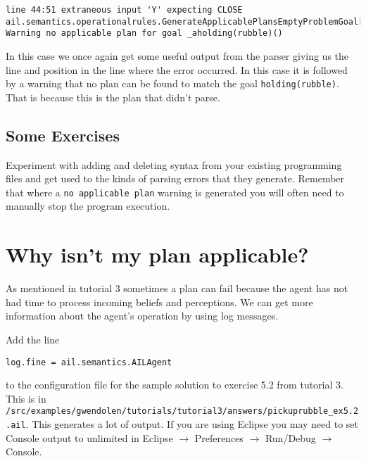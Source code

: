 \begin{verbatim}
line 44:51 extraneous input 'Y' expecting CLOSE
ail.semantics.operationalrules.GenerateApplicablePlansEmptyProblemGoal[WARNING|main|3:19:44]: 
Warning no applicable plan for goal _aholding(rubble)() 
\end{verbatim}

In this case we once again get some useful output from the parser giving us the line and position in the line where the error occurred.  In this case it is followed by a warning that no plan can be found to match the goal \texttt{holding(rubble)}.  That is because this is the plan that didn't parse.

\subsection{Some Exercises}
Experiment with adding and deleting syntax from your existing programming files and get used to the kinds of parsing errors that they generate.  Remember that where a \texttt{no applicable plan} warning is generated you will often need to manually stop the program execution.

\section{Why isn't my plan applicable?}

As mentioned in tutorial 3 sometimes a plan can fail because the agent has not had time to process incoming beliefs and perceptions.  We can get more information about the agent's operation by using log messages.

Add the line
\begin{verbatim}
log.fine = ail.semantics.AILAgent
\end{verbatim}
to the configuration file for the sample solution to exercise 5.2 from tutorial 3.  This is in \texttt{/src/examples/gwendolen/tutorials/tutorial3/answers/pickuprubble\_ex5.2.ail}.  This generates a lot of output.  If you are using Eclipse you may need to set Console output to unlimited in Eclipse $\rightarrow$ Preferences $\rightarrow$ Run/Debug $\rightarrow$ Console.

